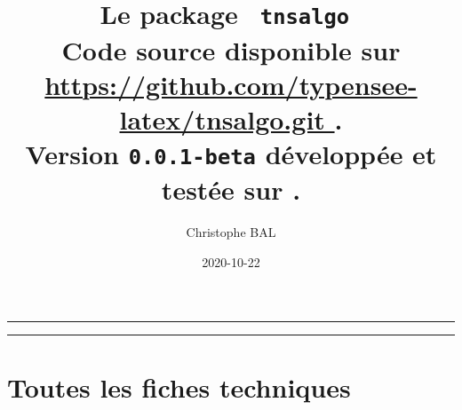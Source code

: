 \documentclass[12pt,a4paper]{article}
\begin{document}
\renewcommand\labelitemi{\raisebox{0.125em}{\tiny\textbullet}}
\renewcommand{\labelitemii}{---}

\title{   %
	Le package \texttt{ tnsalgo }\\%
	{\footnotesize Code source disponible sur \url{ https://github.com/typensee-latex/tnsalgo.git }.}\\%
{\footnotesize Version \texttt{0.0.1-beta} développée et testée sur \macosxname{}.}%
}
\author{Christophe BAL}
\date{2020-10-22}

\maketitle


\vspace{2em}

\hrule

\tableofcontents

\vspace{1.5em}

\hrule

\newpage



\newpage
\section{Toutes les fiches techniques} \label{techincal-ids}

\end{document}
